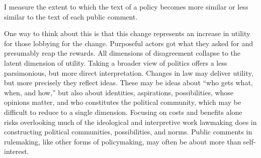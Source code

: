 
I measure the extent to which the text of a policy becomes more similar or less similar to the text of each public comment. 

One way to think about this is that this change represents an increase in utility for those lobbying for the change. Purposeful actors got what they asked for and presumably reap the rewards. All dimensions of disagreement collapse to the latent dimension of utility. %
Taking a broader view of politics offers a less parsimonious, but more direct interpretation. Changes in law may deliver utility, but more precisely they reflect ideas. These may be ideas about ``who gets what, when, and how,'' but also about identities, aspirations, possibilities, whose opinions matter, and who constitutes the political community, which may be difficult to reduce to a single dimension. Focusing on costs and benefits alone risks overlooking much of the ideological and interpretive work lawmaking does in constructing political communities, possibilities, and norms. Public comments in rulemaking, like other forms of policymaking, may often be about more than self-interest. 



